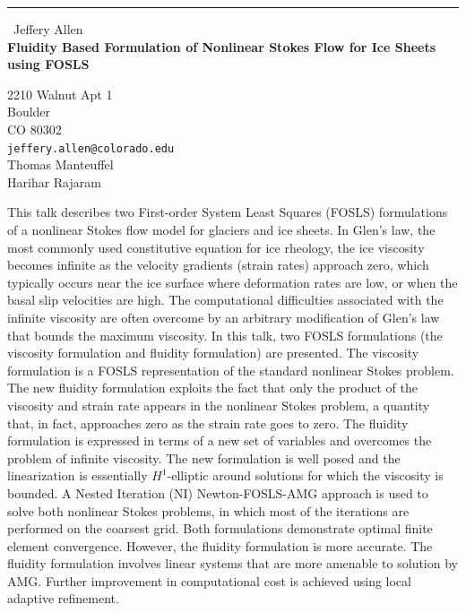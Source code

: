 \documentclass{report}
\begin{document}
\begin{center}
\rule{6in}{1pt} \
{\large Jeffery Allen \\
{\bf Fluidity Based Formulation of Nonlinear Stokes Flow for Ice Sheets using FOSLS}}

2210 Walnut Apt 1 \\ Boulder \\ CO 80302
\\
{\tt jeffery.allen@colorado.edu}\\
Thomas Manteuffel \\
Harihar Rajaram\end{center}

This talk describes two First-order System Least Squares (FOSLS)
formulations of a nonlinear Stokes flow model for glaciers and ice
sheets. In Glen's law, the most commonly used constitutive equation for
ice rheology, the ice viscosity becomes infinite as the velocity
gradients (strain rates) approach zero, which typically occurs near the
ice surface where deformation rates are low, or when the basal slip
velocities are high. The computational difficulties associated with the
infinite viscosity are often overcome by an arbitrary modification of
Glen's law that bounds the maximum viscosity. In this talk, two FOSLS
formulations (the viscosity formulation and fluidity formulation) are
presented. The viscosity formulation is a FOSLS representation of the
standard nonlinear Stokes problem. The new fluidity formulation exploits
the fact that only the product of the viscosity and strain rate appears
in the nonlinear Stokes problem, a quantity that, in fact, approaches
zero as the strain rate goes to zero. The fluidity formulation is
expressed in terms of a new set of variables and overcomes the problem of
infinite viscosity. The new formulation is well posed and the
linearization is essentially $H^1$-elliptic around solutions for which
the viscosity is bounded. A Nested Iteration (NI) Newton-FOSLS-AMG
approach is used to solve both nonlinear Stokes problems, in which most
of the iterations are performed on the coarsest grid. Both formulations
demonstrate optimal finite element convergence. However, the fluidity
formulation is more accurate. The fluidity formulation involves linear
systems that are more amenable to solution by AMG. Further improvement in
computational cost is achieved using local adaptive refinement.
\end{document}
